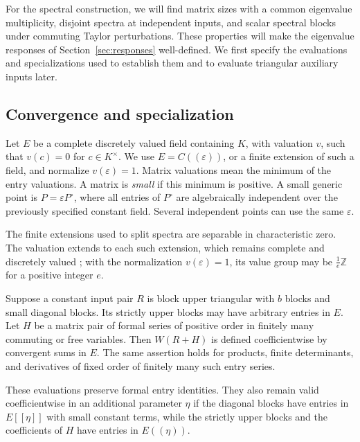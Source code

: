 For the spectral construction, we will find matrix sizes with a common
eigenvalue multiplicity, disjoint spectra at independent inputs, and
scalar spectral blocks under commuting Taylor perturbations. These
properties will make the eigenvalue responses of
Section~\ref{sec:responses} well-defined. We first specify the
evaluations and specializations used to establish them and to evaluate
triangular auxiliary inputs later.

\subsection{Convergence and specialization}\label{subsec:formal-conventions}

Let $E$ be a complete discretely valued field containing $K$, with
valuation $v$, such that $v(c)=0$ for $c\in K^\times$.  We use
$E=C((\varepsilon))$, or a finite extension of such a field, and
normalize $v(\varepsilon)=1$.  Matrix valuations mean the minimum of
the entry valuations.  A matrix is \emph{small} if this minimum is
positive.  A small generic point is
$P=\varepsilon P^\circ$, where all entries of $P^\circ$ are
algebraically independent over the previously specified constant
field.  Several independent points can use the same $\varepsilon$.

The finite extensions used to split spectra are separable in
characteristic zero. The valuation extends to each such extension,
which remains complete and discretely valued
\cite[Theorem~7.38 and Remark~7.43]{MilneANT}; with the normalization
$v(\varepsilon)=1$, its value group may be $\frac1e\mathbb Z$ for a
positive integer $e$.

\begin{lemma}\label{lem:admissible-evaluation}
Suppose a constant input pair $R$ is block upper triangular with $b$
blocks and small diagonal blocks.  Its strictly upper blocks may have
arbitrary entries in $E$.  Let $H$ be a matrix pair of formal series
of positive order in finitely many commuting or free variables.
Then $W(R+H)$ is defined coefficientwise by convergent sums in $E$.
The same assertion holds for products, finite determinants, and
derivatives of fixed order of finitely many such entry series.

These evaluations preserve formal entry identities.  They also
remain valid coefficientwise in an additional parameter $\eta$ if
the diagonal blocks have entries in $E[[\eta]]$ with small constant
terms, while the strictly upper blocks and the coefficients of $H$
have entries in $E((\eta))$.
\end{lemma}


